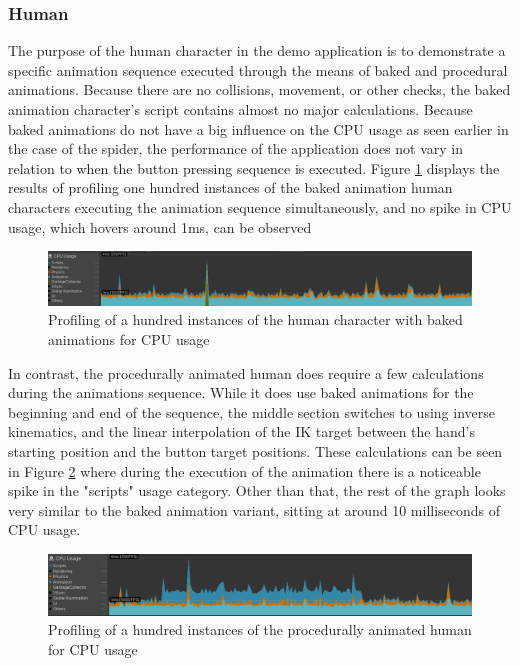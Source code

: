 \subsubsection{Human}
The purpose of the human character in the demo application is to demonstrate
a specific animation sequence executed through the means of baked and procedural
animations. Because there are no collisions, movement, or other checks, the baked
animation character's script contains almost no major calculations. Because
baked animations do not have a big influence on the CPU usage as seen earlier in
the case of the spider, the performance of the application does not vary in
relation to when the button pressing sequence is executed. Figure
\ref{fig:pr_h_b} displays the results of profiling one hundred instances of the
baked animation human characters executing the animation sequence
simultaneously, and no spike in CPU usage, which hovers around 1ms, can be
observed

\begin{figure}[h!]
    \centering
    \captionsetup{justification=centering}
    \includegraphics[width=\textwidth]{grafika/pr_h_b.png}
    \caption{Profiling of a hundred instances of the human character with baked
    animations for CPU usage}
    \label{fig:pr_h_b}
\end{figure}

In contrast, the procedurally animated human does require a few calculations
during the animations sequence. While it does use baked animations for the
beginning and end of the sequence, the middle section switches to using inverse
kinematics, and the linear interpolation of the IK target between the hand's
starting position and the button target positions. These calculations can be
seen in Figure \ref{fig:pr_h_ik} where during the execution of the animation
there is a noticeable spike in the "scripts" usage category. Other than that,
the rest of the graph looks very similar to the baked animation variant, sitting
at around 10 milliseconds of CPU usage.

\begin{figure}[h!]
    \centering
    \captionsetup{justification=centering}
    \includegraphics[width=\textwidth]{grafika/pr_h_ik.png}
    \caption{Profiling of a hundred instances of the procedurally animated human
    for CPU usage}
    \label{fig:pr_h_ik}
\end{figure}


